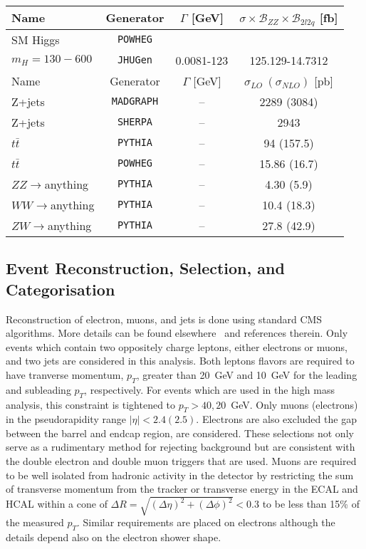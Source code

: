 \begin{table}
\begin{center}
\begin{tabular}{l|c|c|c}
\hline 
\hline
Name & Generator & $\Gamma$ [GeV] & $\sigma\times\mathscr{B}_{ZZ}\times\mathscr{B}_{2l2q}$ [fb] \\
\hline
SM Higgs  & \verb+POWHEG+ & & \\
$m_H=130-600$ & \verb+JHUGen+ & 0.0081-123 & 125.129-14.7312 \\ 
\hline \hline
Name & Generator & $\Gamma$ [GeV] & $\sigma_{LO}~(\sigma_{NLO})$ [pb] \\ \hline \hline
Z+jets    & \verb+MADGRAPH+ & -- & 2289 (3084) \\
Z+jets    & \verb+SHERPA+  & -- & 2943        \\
$t\bar{t}$& \verb+PYTHIA+   & -- & 94 (157.5)  \\
$t\bar{t}$& \verb+POWHEG+   & -- & 15.86 (16.7)\\
$ZZ\to$anything & \verb+PYTHIA+ & -- & 4.30 (5.9) \\ 
$WW\to$anything & \verb+PYTHIA+ & -- & 10.4 (18.3) \\ 
$ZW\to$anything & \verb+PYTHIA+ & -- & 27.8 (42.9) \\ 
\hline\hline
\end{tabular}
\caption{}
\label{table:HZZ2l2qMCsamples}
\end{center}
\end{table}

\subsection{Event Reconstruction, Selection, and Categorisation}
\label{sec:HZZ2l2qselection}

Reconstruction of electron, muons, and jets is done using
standard CMS algorithms.  More details can be found elsewhere~\cite{Chatrchyan:2012sn} and references therein.  Only events which contain
two oppositely charge leptons, either electrons or
muons, and two jets are considered in this analysis.  Both leptons
flavors are required to have tranverse momentum, $p_T$, greater
than 20~GeV
and 10~GeV for the leading and subleading $p_T$, respectively.  For events 
which are used in the high mass analysis, this constraint is tightened to 
$p_T>40, 20$~GeV.  Only muons (electrons) in the pseudorapidity range 
$|\eta|<2.4 (2.5)$.  Electrons are also excluded the gap between the barrel and endcap region, 
are considered.  These selections not only serve as a rudimentary method for
rejecting background but are consistent with the double electron and 
double muon triggers that are used.  Muons are required to be well 
isolated from hadronic activity in the detector by restricting the sum of
transverse momentum from the tracker or transverse energy in the ECAL and
HCAL within a cone of $\Delta R  = \sqrt{(\Delta\eta)^2+(\Delta\phi)^2}<0.3$
to be less than 15\% of the measured $p_T$.  Similar requirements are placed
on electrons although the details depend also on the electron shower shape.

